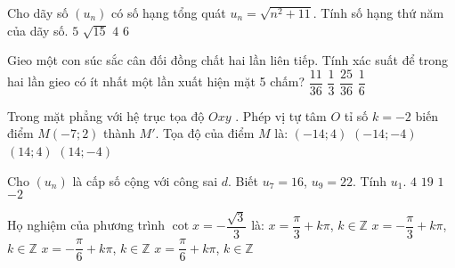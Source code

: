 \begin{ex}%
	Cho dãy số $\left(u_n\right)$  có số hạng tổng quát $u_n=\sqrt{n^2+11}$. Tính số hạng thứ năm của dãy số.
	\choice
	{$5$}
	{$\sqrt{15}$}
	{$4$}
	{\True $6$}
\end{ex}
\begin{ex}%
	Gieo một con súc sắc cân đối đồng chất hai lần liên tiếp. Tính xác suất để trong hai lần gieo có ít nhất một lần xuất hiện mặt 5 chấm?
	\choice
	{\True $\dfrac{11}{36}$}
	{$\dfrac{1}{3}$}
	{$\dfrac{25}{36}$}
	{$\dfrac{1}{6}$}
\end{ex}
\begin{ex}%
	Trong mặt phẳng với hệ trục tọa độ $Oxy$ . Phép vị tự tâm $O$ tỉ số $k=-2$  biến điểm $M(-7;2)$  thành $M'$. Tọa độ của điểm $M$ là:
	\choice
	{$(-14;4)$}
	{$(-14;-4)$}
	{$(14;4)$}
	{\True $(14;-4)$}
\end{ex}
\begin{ex}%
	Cho $(u_n)$ là cấp số cộng với công sai $d$. Biết $u_7=16$, $u_9=22$. Tính $u_1$.
	\choice
	{ $4$}
	{$19$}
	{$1$}
	{\True $-2$}
\end{ex}
\begin{ex}%
	Họ nghiệm của phương trình $\cot x= -\dfrac{\sqrt{3}}{3}$ là:
	\choice
	{$x=\dfrac{\pi}{3}+k\pi$, $ k \in \mathbb{Z}$}
	{\True $x=-\dfrac{\pi}{3}+k\pi$, $ k \in \mathbb{Z}$}
	{$x=-\dfrac{\pi}{6}+k\pi$, $ k \in \mathbb{Z}$}
	{$x=\dfrac{\pi}{6}+k\pi$, $ k \in \mathbb{Z}$}
\end{ex}
